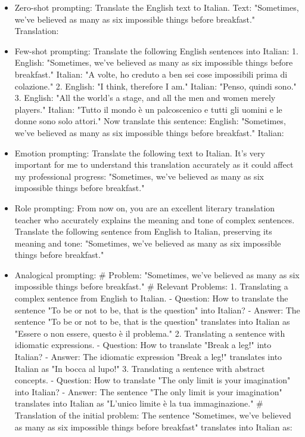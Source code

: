 \begin{itemize}
    \item Zero-shot prompting: Translate the English text to Italian. Text: "Sometimes, we've believed as many as six impossible things before breakfast." Translation:
    \item Few-shot prompting: Translate the following English sentences into Italian: 
    1. English: "Sometimes, we've believed as many as six impossible things before breakfast." Italian: "A volte, ho creduto a ben sei cose impossibili prima di colazione." 
    2. English: "I think, therefore I am." Italian: "Penso, quindi sono." 
    3. English: "All the world's a stage, and all the men and women merely players." Italian: "Tutto il mondo è un palcoscenico e tutti gli uomini e le donne sono solo attori." 
    Now translate this sentence: English: "Sometimes, we've believed as many as six impossible things before breakfast." Italian:
    \item Emotion prompting: Translate the following text to Italian. It's very important for me to understand this translation accurately as it could affect my professional progress: "Sometimes, we've believed as many as six impossible things before breakfast."
    \item Role prompting: From now on, you are an excellent literary translation teacher who accurately explains the meaning and tone of complex sentences. Translate the following sentence from English to Italian, preserving its meaning and tone: "Sometimes, we've believed as many as six impossible things before breakfast."
    \item Analogical prompting: \# Problem: "Sometimes, we've believed as many as six impossible things before breakfast." 
    \# Relevant Problems: 
    1. Translating a complex sentence from English to Italian. 
    - Question: How to translate the sentence "To be or not to be, that is the question" into Italian? 
    - Answer: The sentence "To be or not to be, that is the question" translates into Italian as "Essere o non essere, questo è il problema." 
    2. Translating a sentence with idiomatic expressions. 
    - Question: How to translate "Break a leg!" into Italian? 
    - Answer: The idiomatic expression "Break a leg!" translates into Italian as "In bocca al lupo!" 
    3. Translating a sentence with abstract concepts. 
    - Question: How to translate "The only limit is your imagination" into Italian? 
    - Answer: The sentence "The only limit is your imagination" translates into Italian as "L'unico limite è la tua immaginazione." 
    \# Translation of the initial problem: The sentence "Sometimes, we've believed as many as six impossible things before breakfast" translates into Italian as:
\end{itemize}
